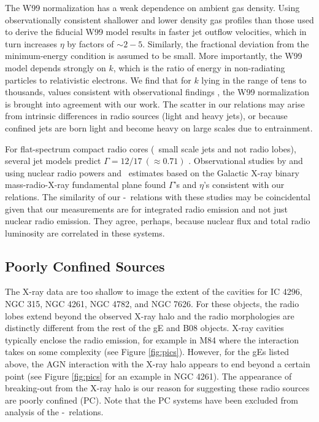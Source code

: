 \documentclass[12pt, preprint]{aastex}
\begin{document}
The W99 normalization has a weak dependence on ambient gas density.
Using observationally consistent shallower and lower density gas
profiles than those used to derive the fiducial W99 model results in
faster jet outflow velocities, which in turn increases $\eta$ by
factors of $\sim 2-5$. Similarly, the fractional deviation from the
minimum-energy condition is assumed to be small. More importantly, the
W99 model depends strongly on $k$, which is the ratio of energy in
non-radiating particles to relativistic electrons. We find that for
$k$ lying in the range of tens to thousands, values consistent with
observational findings \citep{2005MNRAS.364.1343D,
  2006MNRAS.372.1741D, 2006ApJ...648..200D, birzan08}, the W99
normalization is brought into agreement with our work. The scatter in
our relations may arise from intrinsic differences in radio sources
(light and heavy jets), or because confined jets are born light and
become heavy on large scales due to entrainment.

For flat-spectrum compact radio cores (\ie\ small scale jets and not
radio lobes), several jet models predict $\Gamma = 12/17 ~(\approx
0.71)$ \citep{1979ApJ...232...34B, 1995A&A...293..665F,
  2003MNRAS.343L..59H}. Observational studies by
\citet{2005ApJ...633..384H} and \citet{2007MNRAS.381..589M} using
nuclear radio powers and \pjet\ estimates based on the Galactic X-ray
binary mass-radio-X-ray fundamental plane \citep{2003MNRAS.344...60G,
  2003MNRAS.345.1057M} found $\Gamma$'s and $\eta$'s consistent with
our relations. The similarity of our \pjet-\prad\ relations with these
studies may be coincidental given that our measurements are for
integrated radio emission and not just nuclear radio emission. They
agree, perhaps, because nuclear flux and total radio luminosity are
correlated in these systems.

\subsection{Poorly Confined Sources}
\label{sec:jet}

The X-ray data are too shallow to image the extent of the cavities for
IC 4296, NGC 315, NGC 4261, NGC 4782, and NGC 7626. For these objects,
the radio lobes extend beyond the observed X-ray halo and the radio
morphologies are distinctly different from the rest of the gE and B08
objects. X-ray cavities typically enclose the radio emission, for
example in M84 \citep{2008ApJ...686..911F} where the interaction takes
on some complexity (see Figure \ref{fig:pics}). However, for the gEs
listed above, the AGN interaction with the X-ray halo appears to end
beyond a certain point (see Figure \ref{fig:pics} for an example in
NGC 4261). The appearance of breaking-out from the X-ray halo is our
reason for suggesting these radio sources are poorly confined
(PC). Note that the PC systems have been excluded from analysis of the
\pjet-\prad\ relations.
\end{document}
